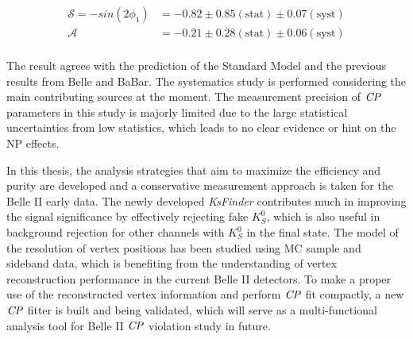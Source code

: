 \begin{equation}\label{eq:data_fit_cp}
\begin{split}
\mathcal{S}=- sin(2\phi_1) & = -0.82 \pm 0.85(\text{stat}) \pm 0.07(\text{syst}) \\
\mathcal{A} & = -0.21\pm 0.28(\text{stat}) \pm 0.06(\text{syst})\\
\end{split}
\end{equation}  

The result agrees with the prediction of the Standard Model and the previous results from Belle and BaBar. The systematics study is performed considering the main contributing sources at the moment. The measurement precision of $\it{CP}$ parameters in this study is majorly limited due to the large statistical uncertainties from low statistics, which leads to no clear evidence or hint on the NP effects. 
 
In this thesis, the analysis strategies that aim to maximize the efficiency and purity are developed and a conservative measurement approach is taken for the Belle II early data. The newly developed \textit{KsFinder} contributes much in improving the signal significance by effectively rejecting fake $K_S^0$, which is also useful in background rejection for other channels with $K_S^0$ in the final state.  The model of the resolution of vertex positions has been studied using MC sample and sideband data, which is benefiting from the understanding of vertex reconstruction performance in the current Belle II detectors. To make a proper use of the reconstructed vertex information and perform $\it{CP}$ fit compactly, a new $\it{CP}$ fitter is built and being validated, which will serve as a multi-functional analysis tool for Belle II $\it{CP}$ violation study in future. 
 

